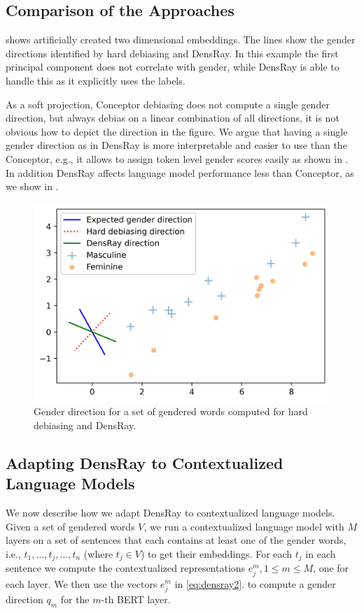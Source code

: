 \subsection{Comparison of the Approaches}
  shows artificially created two dimensional embeddings. The lines show the gender directions identified by hard debiasing and DensRay. In this example
 the first principal component does not correlate with gender, while DensRay is able to handle this as it explicitly uses the labels.
 
As a soft projection, Conceptor debiasing does not compute a single gender direction, but always debias on a linear combination of all directions, it is not obvious how to depict the direction in the figure. 
We argue that having a single gender direction as in DensRay is more interpretable and easier to use than the Conceptor, e.g., it allows to assign token level gender scores easily as shown in . In addition DensRay affects language model performance less than Conceptor, as we show in .
\begin{figure}[h]
	\centering
	\vspace{0cm}  
	\setlength{\abovecaptionskip}{0.0cm}   
	\setlength{\belowcaptionskip}{0cm}
	\includegraphics[width=0.4\linewidth]{examples.png}
	\caption{Gender direction for a set of gendered
          words computed for hard debiasing and DensRay.}
\end{figure}

\subsection{Adapting DensRay to Contextualized Language Models}
We now describe how we adapt DensRay to contextualized
language models. Given a set of gendered words
$V$, we run a contextualized language model
with $M$ layers
on a set of 
sentences that each contains at least one of the gender words, i.e., 
$t_1,\ldots,t_j,\ldots,t_n$ (where $t_j \in V$) to get their embeddings. 
For each $t_j $ in each sentence we compute the contextualized representations $e_j^m, 1\leq m
\leq M$, one for each layer. We then use the vectors $e_j^m$ in \eqref{eq:densray2}.
to compute a gender direction
$q_m$ for the $m$-th BERT layer. 
